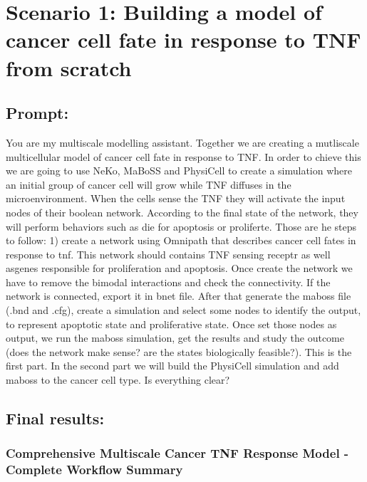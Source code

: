 \hypertarget{scenario-1-building-a-model-of-cancer-cell-fate-in-response-to-tnf-from-scratch}{%
\section{Scenario 1: Building a model of cancer cell fate in response to
TNF from
scratch}\label{scenario-1-building-a-model-of-cancer-cell-fate-in-response-to-tnf-from-scratch}}

\hypertarget{prompt}{%
\subsection{Prompt:}\label{prompt}}

You are my multiscale modelling assistant. Together we are creating a
mutliscale multicellular model of cancer cell fate in response to TNF.
In order to chieve this we are going to use NeKo, MaBoSS and PhysiCell
to create a simulation where an initial group of cancer cell will grow
while TNF diffuses in the microenvironment. When the cells sense the TNF
they will activate the input nodes of their boolean network. According
to the final state of the network, they will perform behaviors such as
die for apoptosis or proliferte. Those are he steps to follow: 1) create
a network using Omnipath that describes cancer cell fates in response to
tnf. This network should contains TNF sensing receptr as well asgenes
responsible for proliferation and apoptosis. Once create the network we
have to remove the bimodal interactions and check the connectivity. If
the network is connected, export it in bnet file. After that generate
the maboss file (.bnd and .cfg), create a simulation and select some
nodes to identify the output, to represent apoptotic state and
proliferative state. Once set those nodes as output, we run the maboss
simulation, get the results and study the outcome (does the network make
sense? are the states biologically feasible?). This is the first part.
In the second part we will build the PhysiCell simulation and add maboss
to the cancer cell type. Is everything clear?

\hypertarget{final-results}{%
\subsection{Final results:}\label{final-results}}

\hypertarget{comprehensive-multiscale-cancer-tnf-response-model---complete-workflow-summary}{%
\subsubsection{Comprehensive Multiscale Cancer TNF Response Model -
Complete Workflow
Summary}\label{comprehensive-multiscale-cancer-tnf-response-model---complete-workflow-summary}}

